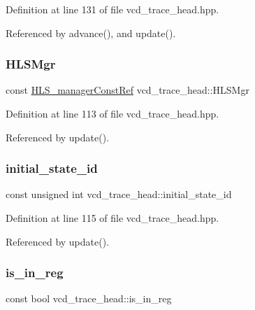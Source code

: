 Definition at line 131 of file vcd\+\_\+trace\+\_\+head.\+hpp.



Referenced by advance(), and update().

\mbox{\label{structvcd__trace__head_a0b276042c7a370e1fbba5b855a57d7f3}} 
\subsubsection{\texorpdfstring{H\+L\+S\+Mgr}{HLSMgr}}
{\footnotesize\ttfamily const \hyperlink{hls__manager_8hpp_a1b481383e3beabc89bd7562ae672dd8c}{H\+L\+S\+\_\+manager\+Const\+Ref} vcd\+\_\+trace\+\_\+head\+::\+H\+L\+S\+Mgr}



Definition at line 113 of file vcd\+\_\+trace\+\_\+head.\+hpp.



Referenced by update().

\mbox{\label{structvcd__trace__head_aabe62f6ae8b5b24732857daaa9df4b30}} 
\subsubsection{\texorpdfstring{initial\+\_\+state\+\_\+id}{initial\_state\_id}}
{\footnotesize\ttfamily const unsigned int vcd\+\_\+trace\+\_\+head\+::initial\+\_\+state\+\_\+id}



Definition at line 115 of file vcd\+\_\+trace\+\_\+head.\+hpp.



Referenced by update().

\mbox{\label{structvcd__trace__head_abd309d5c7d233cb75ca3b117e54c8ccc}} 
\subsubsection{\texorpdfstring{is\+\_\+in\+\_\+reg}{is\_in\_reg}}
{\footnotesize\ttfamily const bool vcd\+\_\+trace\+\_\+head\+::is\+\_\+in\+\_\+reg}



